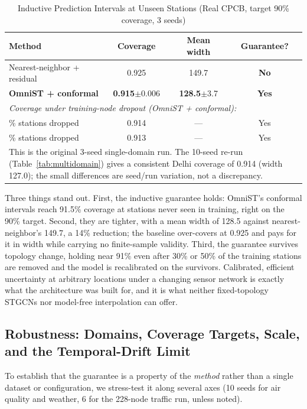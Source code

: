 \documentclass[journal]{IEEEtran}
\begin{document}
\begin{table}[htbp]
\caption{Inductive Prediction Intervals at Unseen Stations (Real CPCB, target 90\% coverage, 3 seeds)}
\centering
\begin{tabular}{lccc}
\toprule
\textbf{Method} & \textbf{Coverage} & \textbf{Mean width} & \textbf{Guarantee?} \\
\midrule
Nearest-neighbor + residual & 0.925 & 149.7 & \textbf{No} \\
\textbf{OmniST + conformal} & \textbf{0.915}$\pm$0.006 & \textbf{128.5}$\pm$3.7 & \textbf{Yes} \\
\midrule
\multicolumn{4}{l}{\footnotesize \emph{Coverage under training-node dropout (OmniST + conformal):}} \\
\quad 30\% stations dropped & 0.914 & --- & Yes \\
\quad 50\% stations dropped & 0.913 & --- & Yes \\
\bottomrule
\multicolumn{4}{p{0.9\columnwidth}}{\footnotesize This is the original 3-seed single-domain run. The
10-seed re-run (Table~\ref{tab:multidomain}) gives a consistent Delhi coverage of 0.914 (width 127.0);
the small differences are seed/run variation, not a discrepancy.} \\
\end{tabular}
\label{tab:conformal}
\end{table}

Three things stand out. First, the inductive guarantee holds: OmniST's conformal intervals reach
91.5\% coverage at stations never seen in training, right on the 90\% target. Second, they are
tighter, with a mean width of 128.5 against nearest-neighbor's 149.7, a 14\% reduction; the baseline
over-covers at 0.925 and pays for it in width while carrying no finite-sample validity. Third, the
guarantee survives topology change, holding near 91\% even after 30\% or 50\% of the training stations
are removed and the model is recalibrated on the survivors. Calibrated, efficient uncertainty at
arbitrary locations under a changing sensor network is exactly what the architecture was built for,
and it is what neither fixed-topology STGCNs nor model-free interpolation can offer.

\subsection{Robustness: Domains, Coverage Targets, Scale, and the Temporal-Drift Limit}
\label{sec:robustness}

To establish that the guarantee is a property of the \emph{method} rather than a single dataset or
configuration, we stress-test it along several axes (10 seeds for air quality and weather, 6 for the
228-node traffic run, unless noted).
\end{document}
